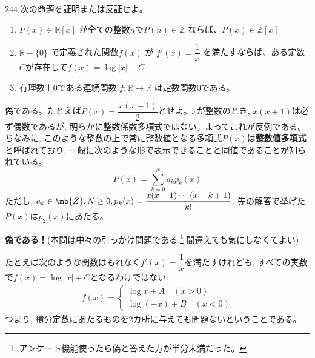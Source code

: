 \begin{prob}{244}{}{}
 次の命題を証明または反証せよ。
 \begin{enumerate}
  \item $P(x)\in\mathbb{R}[x]$ が全ての整数$n$で$P(n)\in\mathbb{Z}$ ならば、$P(x)\in\mathbb{Z}[x]$
  \item $\mathbb{R}-\{0\}$ で定義された関数$f(x)$ が $f'(x)=\dfrac{1}{x}$ を満たすならば、ある定数$C$が存在して$f(x)=\log |x|+C$
  \item 有理数上0である連続関数 $f:\mathbb{R}\rightarrow\mathbb{R}$ は定数関数0である。
 \end{enumerate}
\end{prob}
偽である。たとえば$P(x) = \dfrac{x(x-1)}{2}$とせよ。$x$が整数のとき, $x(x+1)$は必ず偶数であるが, 明らかに整数係数多項式ではない。よってこれが反例である。ちなみに, このような整数の上で常に整数値となる多項式$P(x)$は\textbf{整数値多項式}と呼ばれており, 一般に次のような形で表示できることと同値であることが知られている。
\[ P(x) = \sum_{k=0}^{N} a_kp_{k}(x) \]
ただし, $a_k\in\mb{Z}, N\geq 0,  p_{k}(x) = \dfrac{x(x-1)\cdots (x-k+1)}{k!}$.  先の解答で挙げた$P(x)$は$p_2(x)$にあたる。

 \textbf{偽である！}(本問は中々の引っかけ問題である.\footnote{アンケート機能使ったら偽と答えた方が半分未満だった。} 間違えても気にしなくてよい)

たとえば次のような関数はもれなく$f'(x)=\dfrac{1}{x}$を満たすけれども, すべての実数で$f(x) = \log{|x|}+C$となるわけではない:
\begin{align*}
 f(x)=\left\{
 \begin{aligned}
  \log{x}+A \quad(x>0) \\
  \log{(-x)}+B \quad (x<0)
 \end{aligned}
 \right.
\end{align*}
つまり, 積分定数にあたるものを2カ所に与えても問題ないということである。

